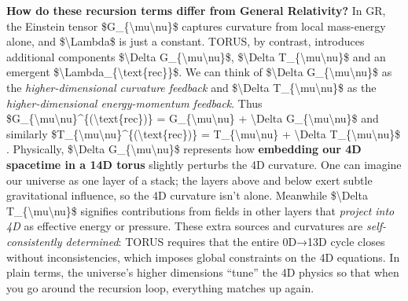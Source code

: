 \textbf{How do these recursion terms differ from General Relativity?} In
GR, the Einstein tensor \$G\_\{\textbackslash{}mu\textbackslash{}nu\}\$
captures curvature from local mass-energy alone, and
\$\textbackslash{}Lambda\$ is just a constant. TORUS, by contrast,
introduces additional components \$\textbackslash{}Delta
G\_\{\textbackslash{}mu\textbackslash{}nu\}\$, \$\textbackslash{}Delta
T\_\{\textbackslash{}mu\textbackslash{}nu\}\$ and an emergent
\$\textbackslash{}Lambda\_\{\textbackslash{}text\{rec\}\}\$. We can
think of \$\textbackslash{}Delta
G\_\{\textbackslash{}mu\textbackslash{}nu\}\$ as the
\emph{higher-dimensional curvature feedback} and \$\textbackslash{}Delta
T\_\{\textbackslash{}mu\textbackslash{}nu\}\$ as the
\emph{higher-dimensional energy-momentum feedback}. Thus
\$G\_\{\textbackslash{}mu\textbackslash{}nu\}\^{}\{(\textbackslash{}text\{rec\})\}
= G\_\{\textbackslash{}mu\textbackslash{}nu\} + \textbackslash{}Delta
G\_\{\textbackslash{}mu\textbackslash{}nu\}\$ and similarly
\$T\_\{\textbackslash{}mu\textbackslash{}nu\}\^{}\{(\textbackslash{}text\{rec\})\}
= T\_\{\textbackslash{}mu\textbackslash{}nu\} + \textbackslash{}Delta
T\_\{\textbackslash{}mu\textbackslash{}nu\}\$​. Physically,
\$\textbackslash{}Delta G\_\{\textbackslash{}mu\textbackslash{}nu\}\$
represents how \textbf{embedding our 4D spacetime in a 14D torus}
slightly perturbs the 4D curvature. One can imagine our universe as one
layer of a stack; the layers above and below exert subtle gravitational
influence, so the 4D curvature isn't alone​. Meanwhile
\$\textbackslash{}Delta T\_\{\textbackslash{}mu\textbackslash{}nu\}\$
signifies contributions from fields in other layers that \emph{project
into 4D} as effective energy or pressure​. These extra sources and
curvatures are \emph{self-consistently determined}: TORUS requires that
the entire 0D→13D cycle closes without inconsistencies, which imposes
global constraints on the 4D equations​. In plain terms, the universe's
higher dimensions ``tune'' the 4D physics so that when you go around the
recursion loop, everything matches up again.

